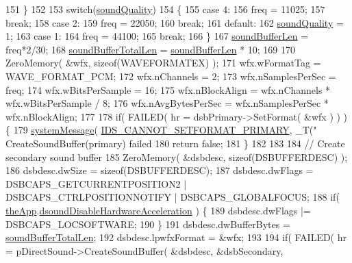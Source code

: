 \begin{DoxyCode}
{{{151     \}
152 
153     \textcolor{keywordflow}{switch}(\mbox{\hyperlink{gb_sound_8cpp_aaeaa156dcc7083863fa6554b8e14854a}{soundQuality}})
154     \{
155     \textcolor{keywordflow}{case} 4:
156         freq = 11025;
157         \textcolor{keywordflow}{break};
158     \textcolor{keywordflow}{case} 2:
159         freq = 22050;
160         \textcolor{keywordflow}{break};
161     \textcolor{keywordflow}{default}:
162         \mbox{\hyperlink{gb_sound_8cpp_aaeaa156dcc7083863fa6554b8e14854a}{soundQuality}} = 1;
163     \textcolor{keywordflow}{case} 1:
164         freq = 44100;
165         \textcolor{keywordflow}{break};
166     \}
167     \mbox{\hyperlink{gb_sound_8cpp_aae9aa4cd368679872bfcb1d851f33019}{soundBufferLen}} = freq*2/30;
168     \mbox{\hyperlink{gb_sound_8cpp_ad35876ee81c2c65072ae9de971b907b8}{soundBufferTotalLen}} = \mbox{\hyperlink{gb_sound_8cpp_aae9aa4cd368679872bfcb1d851f33019}{soundBufferLen}} * 10;
169 
170     ZeroMemory( &wfx, \textcolor{keyword}{sizeof}(WAVEFORMATEX) );
171     wfx.wFormatTag = WAVE\_FORMAT\_PCM;
172     wfx.nChannels = 2;
173     wfx.nSamplesPerSec = freq;
174     wfx.wBitsPerSample = 16;
175     wfx.nBlockAlign = wfx.nChannels * wfx.wBitsPerSample / 8;
176     wfx.nAvgBytesPerSec = wfx.nSamplesPerSec * wfx.nBlockAlign;
177 
178     \textcolor{keywordflow}{if}( FAILED( hr = dsbPrimary->SetFormat( &wfx ) ) ) \{
179         \mbox{\hyperlink{system_8cpp_a747a9cb8e015a3d45cca636b5bd0fc69}{systemMessage}}( \mbox{\hyperlink{resource_8h_ac6c8e6c30d61ae3415b65b4e5b27f465}{IDS\_CANNOT\_SETFORMAT\_PRIMARY}}, \_T(\textcolor{stringliteral}{"
      CreateSoundBuffer(primary) failed %
180         \textcolor{keywordflow}{return} \textcolor{keyword}{false};
181     \}
182 
183 
184     \textcolor{comment}{// Create secondary sound buffer}
185     ZeroMemory( &dsbdesc, \textcolor{keyword}{sizeof}(DSBUFFERDESC) );
186     dsbdesc.dwSize = \textcolor{keyword}{sizeof}(DSBUFFERDESC);
187     dsbdesc.dwFlags = DSBCAPS\_GETCURRENTPOSITION2 | DSBCAPS\_CTRLPOSITIONNOTIFY | DSBCAPS\_GLOBALFOCUS;
188     \textcolor{keywordflow}{if}( \mbox{\hyperlink{_v_b_a_8cpp_a8095a9d06b37a7efe3723f3218ad8fb3}{theApp}}.\mbox{\hyperlink{class_v_b_a_a58f89c52283d10a0fcaac8abb7eca524}{dsoundDisableHardwareAcceleration}} ) \{
189         dsbdesc.dwFlags |= DSBCAPS\_LOCSOFTWARE;
190     \}
191     dsbdesc.dwBufferBytes = \mbox{\hyperlink{gb_sound_8cpp_ad35876ee81c2c65072ae9de971b907b8}{soundBufferTotalLen}};
192     dsbdesc.lpwfxFormat = &wfx;
193 
194     \textcolor{keywordflow}{if}( FAILED( hr = pDirectSound->CreateSoundBuffer( &dsbdesc, &dsbSecondary, 
}}}}
\end{DoxyCode}
